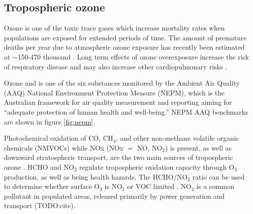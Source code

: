 \subsection{Tropospheric ozone}


Ozone is one of the toxic trace gases which increase mortality rates when populations are exposed for extended periods of time.
The amount of premature deaths per year due to atmospheric ozone exposure has recently been estimated at $\sim$150-470 thousand \cite{Silva_2013, Lelieveld_2015}.
Long term effects of ozone overexposure increase the risk of respiratory disease and may also increase other cardiopulmonary risks \cite{Jerrett_2009}.

Ozone and is one of the six substances monitored by the Ambient Air Quality (AAQ) National Environment Protection Measure (NEPM), which is the Australian framework for air quality measurement and reporting aiming for ``adequate protection of human health and well-being.''
NEPM AAQ benchmarks are shown in figure \ref{fig:nepm}.

Photochemical oxidation of CO, CH$_4$, and other non-methane volatile organic chemicals (NMVOCs) while NOx (NOx $=$ NO, NO$_2$) is present, as well as downward stratospheric transport, are the two main sources of tropospheric ozone \cite{Stevenson_2006}.
HCHO and NO$_2$ regulate tropospheric oxidation capacity through O$_3$ production, as well as being health hazards.
The HCHO/NO$_2$ ratio can be used to determine whether surface O$_3$ is NO$_2$ or VOC limited \cite{Mahajan_2015}.
NO$_2$ is a common pollutant in populated areas, released primarily by power generation and transport (TODO:cite). 

